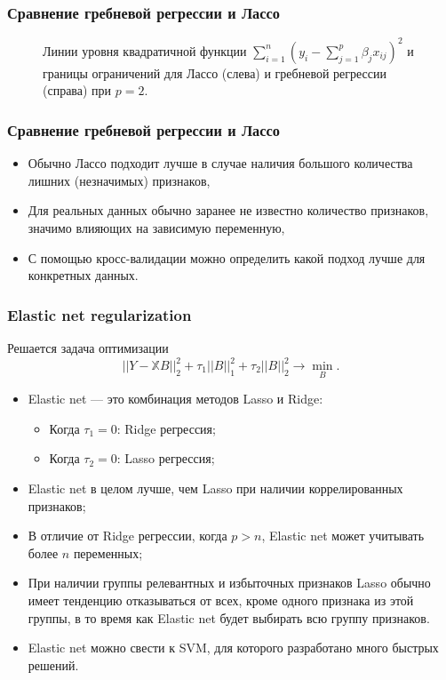 \documentclass[10pt,unicode, notheorems]{beamer}
\begin{document}
\begin{frame}
\frametitle{Сравнение гребневой регрессии и Лассо}
\begin{figure}
\caption{Линии уровня квадратичной функции $\sum_{i=1}^n(y_i - \sum_{j=1}^p \beta_j x_{ij})^2$ и границы ограничений для Лассо (слева) и  гребневой регрессии (справа) при $p=2$.}
\end{figure}
\end{frame}

\begin{frame}
\frametitle{Сравнение гребневой регрессии и Лассо}

\vspace{0.8cm}
\begin{itemize}
\item Обычно Лассо подходит лучше в случае наличия большого количества лишних (незначимых) признаков, 
\item Для реальных данных обычно заранее не известно количество признаков, значимо влияющих на зависимую переменную,
\item С помощью кросс-валидации можно определить какой подход лучше для конкретных данных.
\end{itemize}
\end{frame}


\begin{frame}
\frametitle{Elastic net regularization}
Решается задача оптимизации
\begin{equation*}
||Y-\mathbb{X}B||_{2}^{2} + \tau_{1}||B||_{1}^{2}+\tau_{2}||B||_{2}^{2}
\rightarrow\min_{B}.
\end{equation*}
\begin{itemize}
\item[\checkmark] Elastic net --- это комбинация методов Lasso и Ridge:
\begin{itemize}
\item Когда $\tau_1 = 0$: Ridge регрессия;
\item Когда $\tau_2 = 0$: Lasso регрессия;
\end{itemize}
\item[\checkmark] Elastic net в целом лучше, чем Lasso при наличии коррелированных признаков;
\item[\checkmark] В отличие от Ridge регрессии, когда $p > n$, Elastic net может учитывать более $n$ переменных;
\item[\checkmark] При наличии группы релевантных и избыточных признаков Lasso обычно имеет тенденцию отказываться от всех, кроме одного признака из этой группы, в то время как Elastic net будет выбирать всю группу признаков.
\item[\checkmark] Elastic net можно свести к SVM, для которого разработано много быстрых решений.
\end{itemize}
\end{frame}
\end{document}
